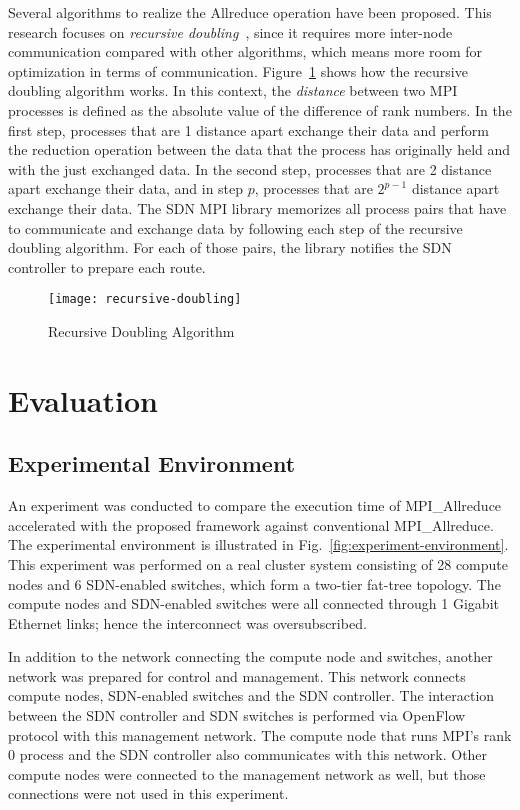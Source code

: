 Several algorithms to realize the Allreduce operation have been proposed.
This research focuses on \emph{recursive doubling}~\autocite{Thakur2005},
since it requires more inter-node communication compared with other
algorithms, which means more room for optimization in terms of communication.
Figure~\ref{fig:recursive-doubling} shows how the recursive doubling algorithm
works. In this context, the \emph{distance} between two MPI processes is
defined as the absolute value of the difference of rank numbers. In the first
step, processes that are 1 distance apart exchange their data and perform the
reduction operation between the data that the process has originally held and
with the just exchanged data. In the second step, processes that are 2
distance apart exchange their data, and in step \(p\), processes that are
\(2^{p - 1}\) distance apart exchange their data. The SDN MPI library
memorizes all process pairs that have to communicate and exchange data by
following each step of the recursive doubling algorithm. For each of those
pairs, the library notifies the SDN controller to prepare each route.

\begin{figure}
    \centering
    \texttt{[image: recursive-doubling]}
    \caption{Recursive Doubling Algorithm}%
    \label{fig:recursive-doubling}
\end{figure}

\section{Evaluation}\label{sec:iii-evaluation}

\subsection{Experimental Environment}

An experiment was conducted to compare the execution time of MPI\_Allreduce
accelerated with the proposed framework against conventional
MPI\_Allreduce. The experimental environment is illustrated in
Fig.~\ref{fig:experiment-environment}. This experiment was performed on
a real cluster system consisting of 28 compute nodes and 6 SDN-enabled
switches, which form a two-tier fat-tree topology. The compute nodes and
SDN-enabled switches were all connected through 1 Gigabit Ethernet links;
hence the interconnect was oversubscribed.

In addition to the network connecting the compute node and switches,
another network was prepared for control and management. This network
connects compute nodes, SDN-enabled switches and the SDN controller.
The interaction between the SDN controller and SDN switches is performed
via OpenFlow protocol with this management network. The compute node
that runs MPI's rank 0 process and the SDN controller also communicates
with this network. Other compute nodes were connected to the
management network as well, but those connections were not used in this
experiment.

